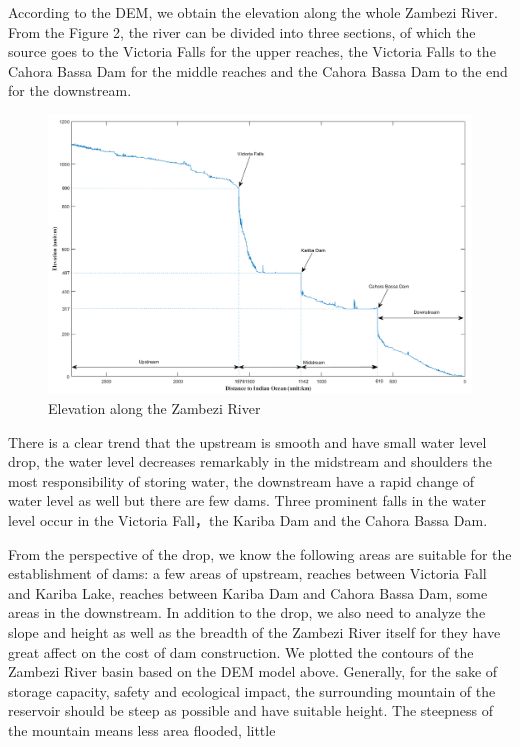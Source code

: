 \documentclass{mcmthesis}
\begin{document}
According to the DEM, we obtain the elevation along the whole Zambezi River. From the Figure 2, the river can be divided into three sections, of which the source goes to the Victoria Falls for the upper reaches, the Victoria Falls to the Cahora Bassa Dam for the middle reaches and the Cahora Bassa Dam to the end for the downstream.

\begin{figure}[h]
\small
\centering
\includegraphics[width=16cm]{./figures/dis_alti_v3.png}
\caption{Elevation along the Zambezi River} \label{fig:Fig2}
\end{figure}

There is a clear trend that the upstream is smooth and have small water level drop, the water level decreases remarkably in the midstream and shoulders the most responsibility of storing water, the downstream have a rapid change of water level as well but there are few dams. Three prominent falls in the water level occur in the Victoria Fall，the Kariba Dam and the Cahora Bassa Dam.

From the perspective of the drop, we know the following areas are suitable for the establishment of dams: a few areas of upstream, reaches between Victoria Fall and Kariba Lake, reaches between Kariba Dam and Cahora Bassa Dam, some areas in the downstream. In addition to the drop, we also need to analyze the slope and height as well as the breadth of the Zambezi River itself for they have great affect on the cost of dam construction. We plotted the contours of the Zambezi River basin based on the DEM model above. Generally, for the sake of storage capacity, safety and ecological impact, the surrounding mountain of the reservoir should be steep as possible and have suitable height. The steepness of the mountain means less area flooded, little 
\end{document}
